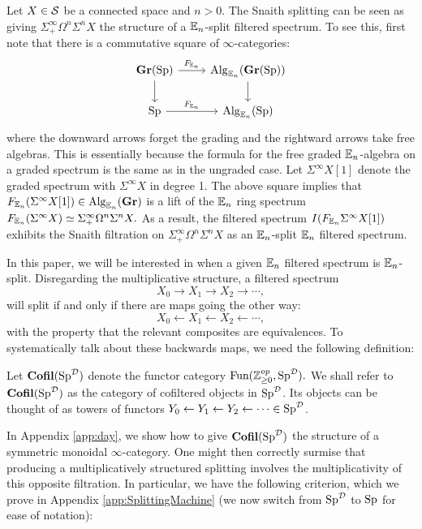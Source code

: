 \begin{exm}\label{exm:snaith}
Let $X\in \operatorname{\mathcal{S}}$ be a connected space and $n>0$.  The Snaith splitting can be seen as giving $\Sigma^{\infty}_+ \Omega^n \Sigma^n X$ the structure of a $\operatorname{\mathbb{E}}_n$-split filtered spectrum.  To see this, first note that there is a commutative square of $\infty$-categories:
$$
\begin{tikzcd}
\Gr(\Sp) \arrow[d]\arrow[r,"F_{\E_n}"]&  \Alg_{\E_n}(\Gr(\Sp)) \arrow[d]\\
\Sp \arrow[r,"F_{\E_n}"] & \Alg_{\E_n}(\Sp) 
\end{tikzcd}
$$
where the downward arrows forget the grading and the rightward arrows take free algebras.  This is essentially because the formula for the free graded $\operatorname{\mathbb{E}}_n$-algebra on a graded spectrum is the same as in the ungraded case.  Let $\Sigma^{\infty} X[1]$ denote the graded spectrum with $\Sigma^{\infty} X$ in degree 1.  The above square implies that $F_{\operatorname{\mathbb{E}}_n}(\Sigma^{\infty} X[1] )\in \operatorname{\mathrm{Alg}}_{\operatorname{\mathbb{E}}_n}(\operatorname{\mathbf{Gr}})$ is a lift of the $\operatorname{\mathbb{E}}_n$ ring spectrum $F_{\operatorname{\mathbb{E}}_n}(\Sigma^{\infty} X) \simeq \Sigma^{\infty}_+ \Omega^n \Sigma^n X.$  As a result, the filtered spectrum $I(F_{\operatorname{\mathbb{E}}_n} \Sigma^{\infty} X[1])$ exhibits the Snaith filtration on $\Sigma^{\infty}_+ \Omega^n \Sigma^n X$ as an $\operatorname{\mathbb{E}}_n$-split $\operatorname{\mathbb{E}}_n$ filtered spectrum.  
\end{exm}

In this paper, we will be interested in when a given $\operatorname{\mathbb{E}}_n$ filtered spectrum is $\operatorname{\mathbb{E}}_n$-split.  Disregarding the multiplicative structure, a filtered spectrum $$X_0\longrightarrow X_1 \longrightarrow X_2 \longrightarrow \cdots ,$$ will split if and only if there are maps going the other way: $$X_0 \longleftarrow X_1 \longleftarrow X_2 \longleftarrow \cdots,$$ with the property that the relevant composites are equivalences.   To systematically talk about these backwards maps, we need the following definition:

\begin{dfn} Let $\operatorname{\mathbf{Cofil}}(\operatorname{\mathrm{Sp}}^{\operatorname{\mathcal{D}}})$ denote the functor category $\operatorname{\text{Fun}}(\operatorname{\mathbb{Z}}_{\geq 0}^{op}, \operatorname{\mathrm{Sp}}^{\operatorname{\mathcal{D}}}).$  We shall refer to $\operatorname{\mathbf{Cofil}}(\operatorname{\mathrm{Sp}}^{\operatorname{\mathcal{D}}})$ as the category of cofiltered objects in $\operatorname{\mathrm{Sp}}^{\operatorname{\mathcal{D}}}$.  Its objects can be thought of as towers of functors $Y_0\leftarrow Y_1\leftarrow Y_2 \leftarrow \cdots \in \operatorname{\mathrm{Sp}}^{\operatorname{\mathcal{D}}}$.
\end{dfn}

In Appendix \ref{app:day}, we show how to give $\operatorname{\mathbf{Cofil}}(\operatorname{\mathrm{Sp}}^{\operatorname{\mathcal{D}}})$ the structure of a symmetric monoidal $\infty$-category.  One might then correctly surmise that producing a multiplicatively structured splitting involves the multiplicativity of this opposite filtration.  In particular, we have the following criterion, which we prove in Appendix \ref{app:SplittingMachine} (we now switch from $\operatorname{\mathrm{Sp}}^{\operatorname{\mathcal{D}}}$ to $\operatorname{\mathrm{Sp}}$ for ease of notation):

